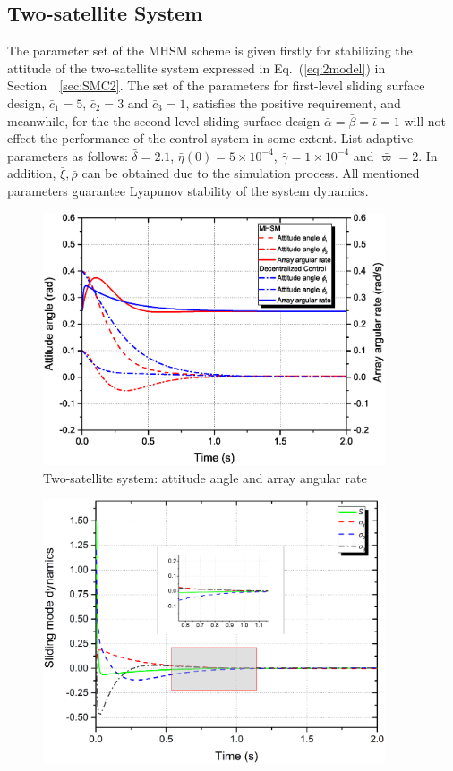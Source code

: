 \subsection{Two-satellite System}
The parameter set of the MHSM scheme is given firstly for stabilizing the attitude of the two-satellite system expressed in Eq.~(\ref{eq:2model}) in Section~~\ref{sec:SMC2}. The set of the parameters for first-level sliding surface design, $\bar c_1 = 5$, $\bar c_2 =3$ and $\bar c_3=1$, satisfies the positive requirement, and meanwhile, for the the second-level sliding surface design $\bar\alpha$$=\bar\beta=\bar\iota=1$ will not effect the performance of the control system in some extent. List adaptive parameters as follows: $\bar\delta = 2.1$, $\bar\eta(0)=5\times 10^{-4}$, $\bar\gamma = 1\times 10^{-4}$ and $\bar\varpi = 2$. In addition, $\bar\xi,\bar\rho$ can be obtained due to the simulation process. All mentioned parameters guarantee Lyapunov stability of the system dynamics.\par
\begin{figure}
\centering
\includegraphics[width=0.9\textwidth]{paper2_Fig8.eps}
\caption{Two-satellite system: attitude angle and array angular rate}
\label{Figure:2attitude}
\end{figure}
\begin{figure}
\centering
\includegraphics[width=0.9\textwidth]{paper2_Fig9.eps}

\end{figure}$$
